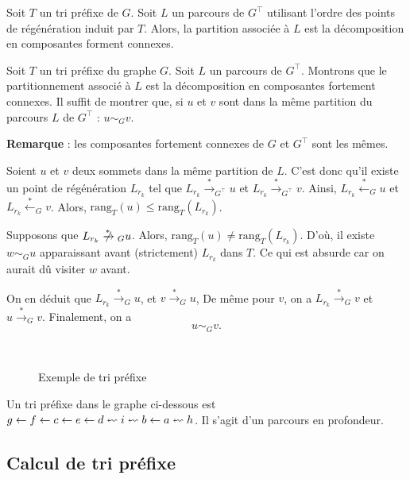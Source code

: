 \begin{prop}
	Soit $T$\/ un tri préfixe de $G$. Soit $L$\/ un parcours de $G^\top $\/ utilisant l'ordre des points de régénération induit par $T$. Alors, la partition associée à $L$\/ est la décomposition en composantes forment connexes.
\end{prop}

\begin{prv}
	Soit $T$\/ un tri préfixe du graphe $G$. Soit $L$\/ un parcours de $G^\top$. Montrons que le partitionnement associé à $L$\/ est la décomposition en composantes fortement connexes. Il suffit de montrer que, si $u$\/ et $v$\/ sont dans la même partition du parcours $L$\/ de $G^\top$\/ : $u \sim_G v$.

	\textbf{Remarque} : les composantes fortement connexes de $G$\/ et $G^\top $\/ sont les mêmes.

	Soient $u$\/ et $v$\/ deux sommets dans la même partition de $L$.
	C'est donc qu'il existe un point de régénération $L_{r_k}$\/ tel que $L_{r_k} \xrightarrow*_{G^\top} u$\/ et $L_{r_k} \xrightarrow*_{G^\top} v$. Ainsi, $L_{r_k} \xleftarrow*_G u$\/ et $L_{r_k} \xleftarrow*_G v$. Alors, $\mathrm{rang}_T(u) \le \mathrm{rang}_T(L_{r_k})$.

	Supposons que $L_{r_k} \centernot{\xrightarrow*}_G u$. Alors, $\mathrm{rang}_T(u) \neq \mathrm{rang}_T(L_{r_k})$. D'où, il existe $w \sim_G u$\/ apparaissant avant (strictement) $L_{r_k}$\/ dans $T$. Ce qui est absurde car on aurait dû visiter $w$\/ avant.

	On en déduit que $L_{r_k} \xrightarrow*_{G} u$, et $v \xrightarrow*_G u$, De même pour $v$, on a $L_{r_k} \xrightarrow*_G v$\/ et $u\xrightarrow*_G v$. Finalement, on a \[
		u \sim_G v
	.\]
\end{prv}

\begin{exm}~\\
	\begin{figure}[H]
		\centering
		\caption{Exemple de tri préfixe}
	\end{figure}
	Un tri préfixe dans le graphe ci-dessous est $g \gets f \gets c \gets e \gets d \revs\leadsto i \revs\leadsto b \gets a \revs\leadsto h$. Il s'agit d'un parcours en profondeur.
\end{exm}

\subsection{Calcul de tri préfixe}

